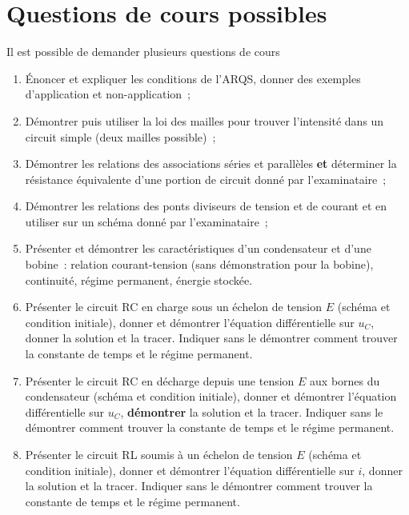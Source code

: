 \documentclass[a4paper, 12pt, final, garamond]{book}
\begin{document}
\section{Questions de cours possibles}
\begin{framed}
    \begin{center}
        \huge Il est possible de demander plusieurs questions de cours
    \end{center}
\end{framed}
\begin{enumerate}
    \item Énoncer et expliquer les conditions de l'ARQS, donner des exemples
        d'application et non-application~;
    \item Démontrer puis utiliser la loi des mailles pour trouver l'intensité
        dans un circuit simple (deux mailles possible)~;
    \item Démontrer les relations des associations séries et parallèles
        \textbf{et} déterminer la résistance équivalente d'une portion de
        circuit donné par l'examinataire~;
    \item Démontrer les relations des ponts diviseurs de tension et de courant
        et en utiliser sur un schéma donné par l'examinataire~;
    \item Présenter et démontrer les caractéristiques d'un condensateur et d'une
        bobine~: relation courant-tension (sans démonstration pour la bobine),
        continuité, régime permanent, énergie stockée.
    \item Présenter le circuit RC en charge sous un échelon de tension $E$
        (schéma et condition initiale), donner et démontrer l'équation
        différentielle sur $u_C$, donner la solution et la tracer. Indiquer sans
        le démontrer comment trouver la constante de temps et le régime
        permanent.
    \item Présenter le circuit RC en décharge depuis une tension $E$ aux bornes
        du condensateur (schéma et condition initiale), donner et démontrer
        l'équation différentielle sur $u_C$, \textbf{démontrer} la solution et
        la tracer. Indiquer sans le démontrer comment trouver la constante de
        temps et le régime permanent.
    \item Présenter le circuit RL soumis à un échelon de tension $E$ (schéma et
        condition initiale), donner et démontrer l'équation différentielle sur
        $i$, donner la solution et la tracer. Indiquer sans le démontrer comment
        trouver la constante de temps et le régime permanent.
\end{enumerate}
\end{document}
